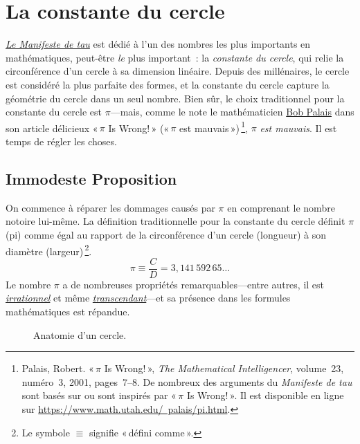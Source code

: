 \section{La constante du cercle} %
\label{sec:the_circle_constant}

\href{https://tauday.com/tau-manifesto}{\emph{Le Manifeste de tau}} est dédié
à l'un des nombres les plus importants en mathématiques, peut-être \emph{le}
plus important~: la \emph{constante du cercle}, qui relie la circonférence
d'un cercle à sa dimension linéaire. Depuis des millénaires, le cercle est
considéré la plus parfaite des formes, et la constante du cercle capture la
géométrie du cercle dans un seul nombre. Bien sûr, le choix traditionnel pour
la constante du cercle est $\pi$---mais, comme le note le mathématicien
\href{https://www.math.utah.edu/~palais/}{Bob Palais} dans son article
délicieux «\,$\pi$ Is Wrong!\,» («\,$\pi$ est mauvais\,»)\,\footnote{Palais,
Robert. «\,$\pi$ Is Wrong!\,», \emph{The Mathematical Intelligencer},
volume~23, numéro~3, 2001, pages~7--8. De nombreux des arguments du
\emph{Manifeste de tau} sont basés sur ou sont inspirés par «\,$\pi$ Is
Wrong!\,». Il est disponible en ligne sur
\href{https://www.math.utah.edu/~palais/pi.html}{https://www.math.utah.edu/~palais/pi.html}.},
$\pi$ \emph{est mauvais}. Il est temps de régler les choses.

  \subsection{Immodeste Proposition} %
  \label{sec:an_immodest_proposal}

On commence à réparer les dommages causés par $\pi$ en comprenant le nombre
notoire lui-même. La définition traditionnelle pour la constante du cercle
définit $\pi$ (pi) comme égal au rapport de la circonférence d'un cercle
(longueur) à son diamètre (largeur)\,\footnote{Le symbole $\equiv$ signifie
«\,défini comme\,».}.
\begin{equation}
\label{eq:pi}
\pi \equiv \frac{C}{D} = 3{,}141\,592\,65\ldots
\end{equation}
Le nombre $\pi$ a de nombreuses propriétés remarquables---entre autres, il est
\href{https://fr.wikipedia.org/wiki/Nombre_irrationnel}{\emph{irrationnel}} et
même \href{https://fr.wikipedia.org/wiki/Nombre_transcendant}{\emph{transcendant}}---et
sa présence dans les formules mathématiques est répandue.

\begin{figure}
\caption{Anatomie d'un cercle.\label{fig:circle}}
\end{figure}

